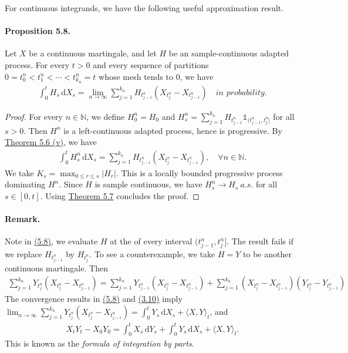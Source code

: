 \documentclass{article}
\numberwithin{equation}{section}
\renewcommand{\d}{\mathrm{d}}
\theoremstyle{plain}
\theoremstyle{definition}
\begin{document}
For continuous integrands, we have the following useful approximation result.
\paragraph{Proposition 5.8.\label{prop:5.8}} Let $X$ be a continuous martingale, and let $H$ be an sample-continuous adapted process. For every $t>0$ and every sequence of partitions $0=t_0^n<t_1^n<\cdots<t_{k_n}^n=t$ whose mesh tends to $0$, we have
\begin{align*}
	\int_0^t H_s\,\d X_s = \lim_{n\to\infty}\sum_{j=1}^{k_n}H_{t_{j-1}^n}(X_{t_j^n}-X_{t_{j-1}^n})\quad\textit{in probability}.\label{eq:5.8}\tag{5.8}
\end{align*}
\begin{proof}
For every $n\in\mathbb{N}$, we define $H_0^n=H_0$ and $H_s^n=\sum_{j=1}^{k_n} H_{t_{j-1}^n}\mathds{1}_{(t_{j-1}^n,t_j^n]}$ for all $s>0$. Then $H^n$ is a left-continuous adapted process, hence is progressive. By \hyperref[thm:5.6]{Theorem 5.6 (v)}, we have
\begin{align*}
	\int_0^t H_s^n\,\d X_s = \sum_{j=1}^{k_n}H_{t_{j-1}^n}(X_{t_j^n}-X_{t_{j-1}^n}),\quad \forall n\in\mathbb{N}.
\end{align*}
We take $K_s=\max_{0\leq r\leq s}\vert H_r\vert$. This is a locally bounded progressive process dominating $H^n$. Since $H$ is sample continuous, we have $H_s^n\to H_s\ a.s.$ for all $s\in[0,t]$. Using \hyperref[thm:5.7]{Theorem 5.7} concludes the proof.
\end{proof}

\paragraph{Remark.} Note in \hyperref[eq:5.8]{(5.8)}, we evaluate $H$ at the  of every interval $(t_{j-1}^n,t_j^n]$. The result fails if we replace $H_{t_{j-1}^n}$ by $H_{t_j^n}$. To see a counterexample, we take $H=Y$ to be another continuous martingale. Then
\begin{align*}
	\sum_{j=1}^{k_n}Y_{t_j^n}(X_{t_j^n}-X_{t_{j-1}^n})=\sum_{j=1}^{k_n}Y_{t_{j-1}^n}(X_{t_j^n}-X_{t_{j-1}^n}) + \sum_{j=1}^{k_n}(X_{t_j^n}-X_{t_{j-1}^n})(Y_{t_j^n}-Y_{t_{j-1}^n})
\end{align*}
The convergence results in \hyperref[eq:5.8]{(5.8)} and \hyperref[eq:3.10]{(3.10)} imply $\lim_{n\to\infty}\sum_{j=1}^{k_n}Y_{t_j^n}(X_{t_j^n}-X_{t_{j-1}^n}) = \int_0^t Y_s\,\d X_s + \langle X,Y\rangle_t$, and
\begin{align*}
	X_tY_t-X_0Y_0 = \int_0^t X_s\,\d Y_s+\int_0^t Y_s\,\d X_s+\langle X,Y\rangle_t.\tag{5.9}\label{eq:5.9}
\end{align*}
This is known as the \textit{formula of integration by parts}.
\end{document}
